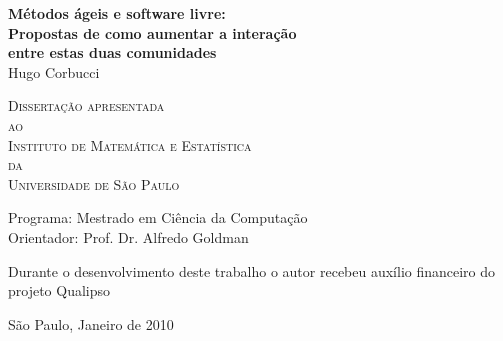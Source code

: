 \documentclass[11pt,twoside,a4paper]{book}
\begin{document}
\frontmatter 
\fancyhead[RO]{{\footnotesize\rightmark}\hspace{2em}\thepage}
\setcounter{tocdepth}{2}
\fancyhead[LE]{\thepage\hspace{2em}\footnotesize{\leftmark}}
\fancyhead[RE,LO]{}
\fancyhead[RO]{{\footnotesize\rightmark}\hspace{2em}\thepage}

\onehalfspacing  %


\thispagestyle{empty}
\begin{center}
  \vspace*{2.3cm}
  \textbf{\Large{Métodos ágeis e software livre:\\
      Propostas de como aumentar a interação\\
      entre estas duas comunidades}}\\
	
  \vspace*{1.2cm} \Large{Hugo Corbucci}
    
  \vskip 2cm \textsc{
    Dissertação apresentada\\[-0.25cm]
    ao\\[-0.25cm]
    Instituto de Matemática e Estatística\\[-0.25cm]
    da\\[-0.25cm]
    Universidade de São Paulo}
    
  \vskip 1.5cm
  Programa: Mestrado em Ciência da Computação\\
  Orientador: Prof. Dr. Alfredo Goldman

  \vskip 1cm \normalsize{Durante o desenvolvimento deste trabalho o
    autor recebeu auxílio financeiro do projeto Qualipso}
	
  \vskip 0.5cm \normalsize{São Paulo, Janeiro de 2010}
\end{center}
\end{document}
